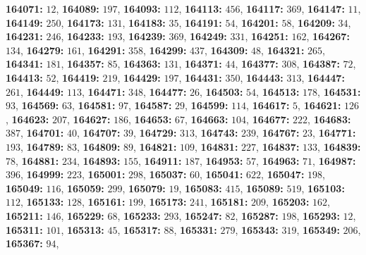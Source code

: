 \textsf{\bfseries 164071:} $12$, \textsf{\bfseries 164089:} $197$, \textsf{\bfseries 164093:} $112$, \textsf{\bfseries 164113:} $456$, \textsf{\bfseries 164117:} $369$, \textsf{\bfseries 164147:} $11$, \textsf{\bfseries 164149:} $250$, \textsf{\bfseries 164173:} $131$, \textsf{\bfseries 164183:} $35$, \textsf{\bfseries 164191:} $54$, \textsf{\bfseries 164201:} $58$, \textsf{\bfseries 164209:} $34$, \textsf{\bfseries 164231:} $246$, \textsf{\bfseries 164233:} $193$, \textsf{\bfseries 164239:} $369$, \textsf{\bfseries 164249:} $331$, \textsf{\bfseries 164251:} $162$, \textsf{\bfseries 164267:} $134$, \textsf{\bfseries 164279:} $161$, \textsf{\bfseries 164291:} $358$, \textsf{\bfseries 164299:} $437$, \textsf{\bfseries 164309:} $48$, \textsf{\bfseries 164321:} $265$, \textsf{\bfseries 164341:} $181$, \textsf{\bfseries 164357:} $85$, \textsf{\bfseries 164363:} $131$, \textsf{\bfseries 164371:} $44$, \textsf{\bfseries 164377:} $308$, \textsf{\bfseries 164387:} $72$, \textsf{\bfseries 164413:} $52$, \textsf{\bfseries 164419:} $219$, \textsf{\bfseries 164429:} $197$, \textsf{\bfseries 164431:} $350$, \textsf{\bfseries 164443:} $313$, \textsf{\bfseries 164447:} $261$, \textsf{\bfseries 164449:} $113$, \textsf{\bfseries 164471:} $348$, \textsf{\bfseries 164477:} $26$, \textsf{\bfseries 164503:} $54$, \textsf{\bfseries 164513:} $178$, \textsf{\bfseries 164531:} $93$, \textsf{\bfseries 164569:} $63$, \textsf{\bfseries 164581:} $97$, \textsf{\bfseries 164587:} $29$, \textsf{\bfseries 164599:} $114$, \textsf{\bfseries 164617:} $5$, \textsf{\bfseries 164621:} $126$, \textsf{\bfseries 164623:} $207$, \textsf{\bfseries 164627:} $186$, \textsf{\bfseries 164653:} $67$, \textsf{\bfseries 164663:} $104$, \textsf{\bfseries 164677:} $222$, \textsf{\bfseries 164683:} $387$, \textsf{\bfseries 164701:} $40$, \textsf{\bfseries 164707:} $39$, \textsf{\bfseries 164729:} $313$, \textsf{\bfseries 164743:} $239$, \textsf{\bfseries 164767:} $23$, \textsf{\bfseries 164771:} $193$, \textsf{\bfseries 164789:} $83$, \textsf{\bfseries 164809:} $89$, \textsf{\bfseries 164821:} $109$, \textsf{\bfseries 164831:} $227$, \textsf{\bfseries 164837:} $133$, \textsf{\bfseries 164839:} $78$, \textsf{\bfseries 164881:} $234$, \textsf{\bfseries 164893:} $155$, \textsf{\bfseries 164911:} $187$, \textsf{\bfseries 164953:} $57$, \textsf{\bfseries 164963:} $71$, \textsf{\bfseries 164987:} $396$, \textsf{\bfseries 164999:} $223$, \textsf{\bfseries 165001:} $298$, \textsf{\bfseries 165037:} $60$, \textsf{\bfseries 165041:} $622$, \textsf{\bfseries 165047:} $198$, \textsf{\bfseries 165049:} $116$, \textsf{\bfseries 165059:} $299$, \textsf{\bfseries 165079:} $19$, \textsf{\bfseries 165083:} $415$, \textsf{\bfseries 165089:} $519$, \textsf{\bfseries 165103:} $112$, \textsf{\bfseries 165133:} $128$, \textsf{\bfseries 165161:} $199$, \textsf{\bfseries 165173:} $241$, \textsf{\bfseries 165181:} $209$, \textsf{\bfseries 165203:} $162$, \textsf{\bfseries 165211:} $146$, \textsf{\bfseries 165229:} $68$, \textsf{\bfseries 165233:} $293$, \textsf{\bfseries 165247:} $82$, \textsf{\bfseries 165287:} $198$, \textsf{\bfseries 165293:} $12$, \textsf{\bfseries 165311:} $101$, \textsf{\bfseries 165313:} $45$, \textsf{\bfseries 165317:} $88$, \textsf{\bfseries 165331:} $279$, \textsf{\bfseries 165343:} $319$, \textsf{\bfseries 165349:} $206$, \textsf{\bfseries 165367:} $94$, 
